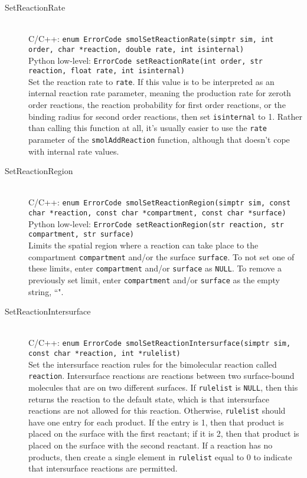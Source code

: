 \documentclass {book}
\newcommand {\ttt} {\texttt}
\begin{document}
\begin{description}
\item[SetReactionRate]
\hfill \\
C/C++: \ttt{enum ErrorCode smolSetReactionRate(simptr sim, int order, char *reaction, double rate, int isinternal)}\\
Python low-level: \ttt{ErrorCode setReactionRate(int order, str reaction, float rate, int isinternal)}\\
Set the reaction rate to \ttt{rate}. If this value is to be interpreted as an internal reaction rate parameter, meaning the production rate for zeroth order reactions, the reaction probability for first order reactions, or the binding radius for second order reactions, then set \ttt{isinternal} to 1. Rather than calling this function at all, it's usually easier to use the \ttt{rate} parameter of the \ttt{smolAddReaction} function, although that doesn't cope with internal rate values.

\item[SetReactionRegion]
\hfill \\
C/C++: \ttt{enum ErrorCode smolSetReactionRegion(simptr sim, const char *reaction, const char *compartment, const char *surface)}\\
Python low-level: \ttt{ErrorCode setReactionRegion(str reaction, str compartment, str surface)}\\
Limits the spatial region where a reaction can take place to the compartment \ttt{compartment} and/or the surface \ttt{surface}. To not set one of these limits, enter \ttt{compartment} and/or \ttt{surface} as \ttt{NULL}. To remove a previously set limit, enter \ttt{compartment} and/or \ttt{surface} as the empty string, ``".

\item[SetReactionIntersurface]
\hfill \\
C/C++: \ttt{enum ErrorCode smolSetReactionIntersurface(simptr sim, const char *reaction, int *rulelist)}\\
Set the intersurface reaction rules for the bimolecular reaction called \ttt{reaction}. Intersurface reactions are reactions between two surface-bound molecules that are on two different surfaces. If \ttt{rulelist} is \ttt{NULL}, then this returns the reaction to the default state, which is that intersurface reactions are not allowed for this reaction. Otherwise, \ttt{rulelist} should have one entry for each product. If the entry is 1, then that product is placed on the surface with the first reactant; if it is 2, then that product is placed on the surface with the second reactant. If a reaction has no products, then create a single element in \ttt{rulelist} equal to 0 to indicate that intersurface reactions are permitted.


\end{description}
\end{document}
